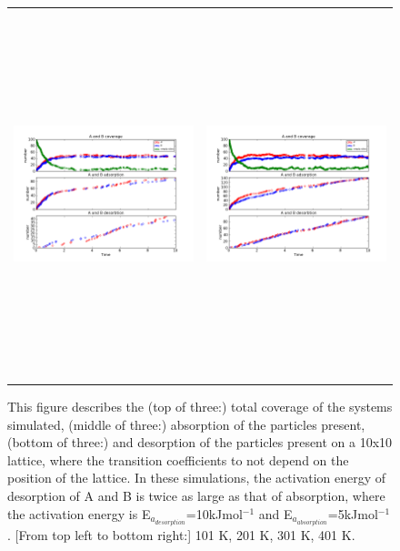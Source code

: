 \documentclass[11pt]{article}
\begin{document}
\begin{figure}[h!]
\begin{tabular}{cc}
\includegraphics[width=3.5in, height=4.2in]{./coadsorb/AtoBcoadsorb10x10_301_desorb2x__Ea5E3_Ed10E3_1.png} &
\includegraphics[width=3.5in, height=4.2in]{./coadsorb/AtoBcoadsorb10x10_401_desorb2x__Ea5E3_Ed10E3_1.png} 
\end{tabular}
\caption{This figure describes the (top of three:) total coverage of the systems simulated, (middle of three:) absorption of the particles present, (bottom of three:) and desorption of the particles present on a 10x10 lattice, where the transition coefficients to not depend on the position of the lattice. In these simulations, the activation energy of desorption of A and B is twice as large as that of absorption, where the activation energy is E$_{a_{desorption}}$=10kJmol$^{-1}$ and E$_{a_{absorption}}$=5kJmol$^{-1}$. [From top left to bottom right:] 101 K, 201 K, 301 K, 401 K. }
\end{figure}
\end{document}
